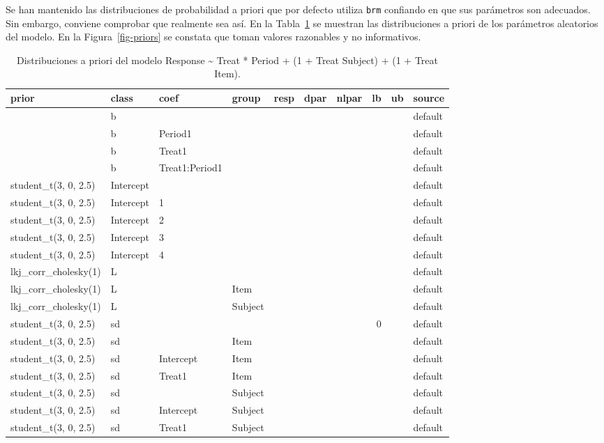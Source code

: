 \documentclass[
  12pt,
  a4paper,
  extrafontsizes,
  onecolumn,
  openright,
  table]{memoir}
\begin{document}
Se han mantenido las distribuciones de probabilidad a priori que por
defecto utiliza \texttt{brm} confiando en que sus parámetros son
adecuados. Sin embargo, conviene comprobar que realmente sea así. En la
Tabla~\ref{tbl-priors} se muestran las distribuciones a priori de los
parámetros aleatorios del modelo. En la Figura~\ref{fig-priors} se
constata que toman valores razonables y no informativos.

\tiny

\hypertarget{tbl-priors}{}
\begin{longtable}{llllrrrrrl}
\caption{\label{tbl-priors}Distribuciones a priori del modelo Response \textasciitilde{} Treat *
Period + (1 + Treat \textbar{} Subject) + (1 + Treat \textbar{} Item). }\tabularnewline

\toprule
prior & class & coef & group & resp & dpar & nlpar & lb & ub & source \\ 
\midrule
 & b &  &  &  &  &  &  &  & default \\ 
 & b & Period1 &  &  &  &  &  &  & default \\ 
 & b & Treat1 &  &  &  &  &  &  & default \\ 
 & b & Treat1:Period1 &  &  &  &  &  &  & default \\ 
student\_t(3, 0, 2.5) & Intercept &  &  &  &  &  &  &  & default \\ 
student\_t(3, 0, 2.5) & Intercept & 1 &  &  &  &  &  &  & default \\ 
student\_t(3, 0, 2.5) & Intercept & 2 &  &  &  &  &  &  & default \\ 
student\_t(3, 0, 2.5) & Intercept & 3 &  &  &  &  &  &  & default \\ 
student\_t(3, 0, 2.5) & Intercept & 4 &  &  &  &  &  &  & default \\ 
lkj\_corr\_cholesky(1) & L &  &  &  &  &  &  &  & default \\ 
lkj\_corr\_cholesky(1) & L &  & Item &  &  &  &  &  & default \\ 
lkj\_corr\_cholesky(1) & L &  & Subject &  &  &  &  &  & default \\ 
student\_t(3, 0, 2.5) & sd &  &  &  &  &  & 0 &  & default \\ 
student\_t(3, 0, 2.5) & sd &  & Item &  &  &  &  &  & default \\ 
student\_t(3, 0, 2.5) & sd & Intercept & Item &  &  &  &  &  & default \\ 
student\_t(3, 0, 2.5) & sd & Treat1 & Item &  &  &  &  &  & default \\ 
student\_t(3, 0, 2.5) & sd &  & Subject &  &  &  &  &  & default \\ 
student\_t(3, 0, 2.5) & sd & Intercept & Subject &  &  &  &  &  & default \\ 
student\_t(3, 0, 2.5) & sd & Treat1 & Subject &  &  &  &  &  & default \\ 
\bottomrule
\end{longtable}
\end{document}
